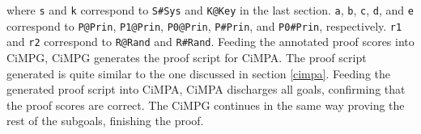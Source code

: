 \documentclass[a4paper,fleqn]{cas-dc}
\begin{document}
where \verb!s! and \verb!k! correspond to \verb!S#Sys! and \verb!K@Key! in the last section.
\verb!a!, \verb!b!, \verb!c!, \verb!d!, and \verb!e! correspond to \verb!P@Prin!, \verb!P1@Prin!, \verb!P0@Prin!, \verb!P#Prin!, and \verb!P0#Prin!, respectively. \verb!r1! and \verb!r2! correspond to \verb!R@Rand! and \verb!R#Rand!.
Feeding the annotated proof scores into CiMPG, CiMPG generates the proof script for CiMPA. The proof script generated is quite similar to the one discussed in section \ref{cimpa}. Feeding the generated proof script into CiMPA, CiMPA discharges all goals, confirming that the proof scores are correct. The CiMPG continues in the same way proving the rest of the subgoals, finishing the proof.



\end{document}
